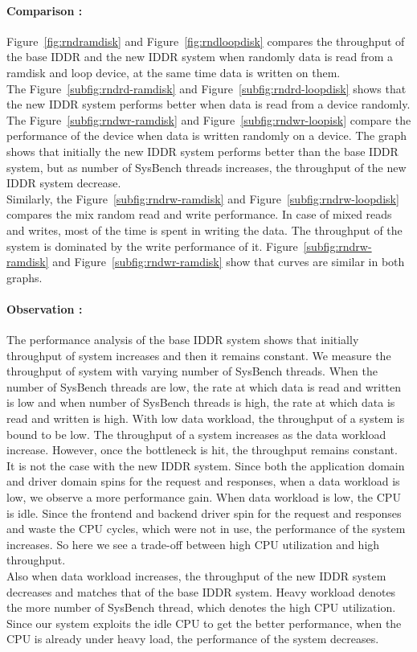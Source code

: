 \paragraph{Comparison :}

Figure~\ref{fig:rndramdisk} and Figure~\ref{fig:rndloopdisk} compares the throughput of the base IDDR and the new IDDR system when randomly data is read from a ramdisk and loop device, at the same time data is written on them.
\\[3mm]
The Figure~\ref{subfig:rndrd-ramdisk} and Figure~\ref{subfig:rndrd-loopdisk} shows that the new IDDR system performs better when data is read from a device randomly.  
\\[3mm]
The Figure~\ref{subfig:rndwr-ramdisk} and Figure~\ref{subfig:rndwr-loopisk} compare the performance of the device when data is written randomly on a device. The graph shows that initially the new IDDR system performs better than the base IDDR system, but as number of SysBench threads increases, the throughput of the new IDDR system decrease.
\\[3mm] 
Similarly, the Figure~\ref{subfig:rndrw-ramdisk} and Figure~\ref{subfig:rndrw-loopdisk} compares the mix random read and write performance. In case of mixed reads and writes, most of the time is spent in writing the data. The throughput of the system is dominated by the write performance of it. Figure~\ref{subfig:rndrw-ramdisk} and Figure~\ref{subfig:rndwr-ramdisk} show that curves are similar in both graphs. 

\paragraph{Observation :}
The performance analysis of the base IDDR system shows that initially throughput of system increases and then it remains constant. We measure the throughput of system with varying number of SysBench threads. When the number of SysBench threads are low, the rate at which data is read and written is low and when number of SysBench threads is high, the rate at which data is read and written is high. With low data workload, the throughput of a system is bound to be low. The throughput of a system increases as the data workload increase. However, once the bottleneck is hit, the throughput remains constant.
\\[3mm]
It is not the case with the new IDDR system. Since both the application domain and driver domain spins for the request and responses, when a data workload is low, we observe a more performance gain. When data workload is low, the CPU is idle. Since the frontend and backend driver spin for the request and responses and waste the CPU cycles, which were not in use, the performance of the system increases. So here we see a trade-off between high CPU utilization and high throughput. 
\\[3mm]
Also when data workload increases, the throughput of the new IDDR system decreases and matches that of the base IDDR system. Heavy workload denotes the more number of SysBench thread, which denotes the high CPU utilization. Since our system exploits the idle CPU to get the better performance, when the CPU is already under heavy load, the performance of the system decreases.

